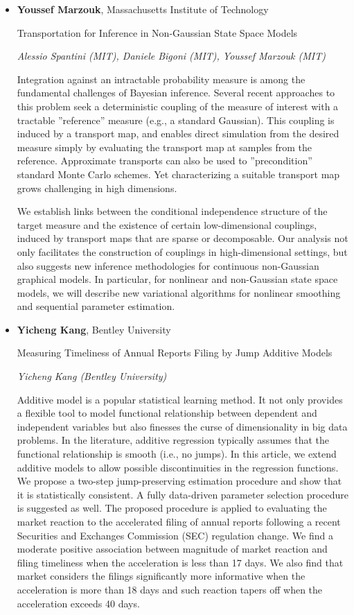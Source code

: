 \begin{itemize}
\item \textbf{Youssef Marzouk}, Massachusetts Institute of Technology

Transportation for Inference in Non-Gaussian State Space Models

\emph{\footnotesize Alessio Spantini (MIT), Daniele Bigoni (MIT), Youssef Marzouk (MIT)}

Integration against an intractable probability measure is among the fundamental challenges of Bayesian inference. Several recent approaches to this problem seek a deterministic coupling of the measure of interest with a tractable ''reference'' measure (e.g., a standard Gaussian). This coupling is induced by a transport map, and enables direct simulation from the desired measure simply by evaluating the transport map at samples from the reference. Approximate transports can also be used to ''precondition'' standard Monte Carlo schemes. Yet characterizing a suitable transport map grows challenging in high dimensions.

We establish links between the conditional independence structure of the target measure and the existence of certain low-dimensional couplings, induced by transport maps that are sparse or decomposable. Our analysis not only facilitates the construction of couplings in high-dimensional settings, but also suggests new inference methodologies for continuous non-Gaussian graphical models. In particular, for nonlinear and non-Gaussian state space models, we will describe new variational algorithms for nonlinear smoothing and sequential parameter estimation.

\item \textbf{Yicheng Kang}, Bentley University

Measuring Timeliness of Annual Reports Filing by Jump Additive Models

\emph{\footnotesize Yicheng Kang (Bentley University)}

Additive model is a popular statistical learning method. It not only provides a flexible tool to model functional relationship between dependent and independent variables but also finesses the curse of dimensionality in big data problems. In the literature, additive regression typically assumes that the functional relationship is smooth (i.e., no jumps). In this article, we extend additive models to allow possible discontinuities in the regression functions.  We propose a two-step jump-preserving estimation procedure and show that it is statistically consistent. A fully data-driven parameter selection procedure is suggested as well. The proposed procedure is applied to evaluating the market reaction to the accelerated filing of annual reports following a recent Securities and Exchanges Commission (SEC) regulation change. We find a moderate positive association between magnitude of market reaction and filing timeliness when the acceleration is less than 17 days. We also find that market considers the filings significantly more informative when the acceleration is more than 18 days and such reaction tapers off when the acceleration exceeds 40 days.

\end{itemize}

